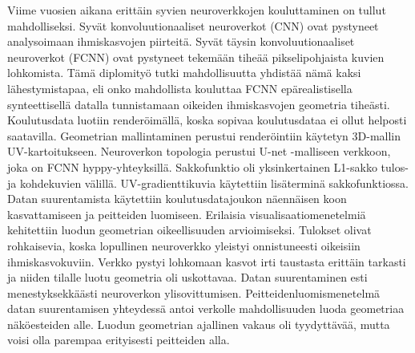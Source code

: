 \documentclass[english,12pt,a4paper,elec,utf8,twopage]{aaltothesis}
\date{20.11.2017}
\begin{document}
    

\makecoverpage

\null\newpage

\begin{abstractpage}[english]
    \abstracttext{}
\end{abstractpage}

\null\newpage



\begin{abstractpage}[finnish]
Viime vuosien aikana erittäin syvien neuroverkkojen kouluttaminen on tullut mahdolliseksi. Syvät konvoluutionaaliset neuroverkot (CNN) ovat pystyneet analysoimaan ihmiskasvojen piirteitä. Syvät täysin konvoluutionaaliset neuroverkot (FCNN) ovat pystyneet tekemään tiheää pikselipohjaista kuvien lohkomista. Tämä diplomityö tutki mahdollisuutta yhdistää nämä kaksi lähestymistapaa, eli onko mahdollista kouluttaa FCNN epärealistisella synteettisellä datalla tunnistamaan oikeiden ihmiskasvojen geometria tiheästi. Koulutusdata luotiin renderöimällä, koska sopivaa koulutusdataa ei ollut helposti saatavilla. Geometrian mallintaminen perustui renderöintiin käytetyn 3D-mallin UV-kartoitukseen. Neuroverkon topologia perustui U-net -malliseen verkkoon, joka on FCNN hyppy-yhteyksillä. Sakkofunktio oli yksinkertainen L1-sakko tulos- ja kohdekuvien välillä. UV-gradienttikuvia käytettiin lisäterminä sakkofunktiossa. Datan suurentamista käytettiin koulutusdatajoukon näennäisen koon kasvattamiseen ja peitteiden luomiseen. Erilaisia visualisaatiomenetelmiä kehitettiin luodun geometrian oikeellisuuden arvioimiseksi. Tulokset olivat rohkaisevia, koska lopullinen neuroverkko yleistyi onnistuneesti oikeisiin ihmiskasvokuviin. Verkko pystyi lohkomaan kasvot irti taustasta erittäin tarkasti ja niiden tilalle luotu geometria oli uskottavaa. Datan suurentaminen esti menestyksekkäästi neuroverkon ylisovittumisen. Peitteidenluomismenetelmä datan suurentamisen yhteydessä antoi verkolle mahdollisuuden luoda geometriaa näköesteiden alle. Luodun geometrian ajallinen vakaus oli tyydyttävää, mutta voisi olla parempaa erityisesti peitteiden alla.
\end{abstractpage}

\null\newpage
\end{document}
